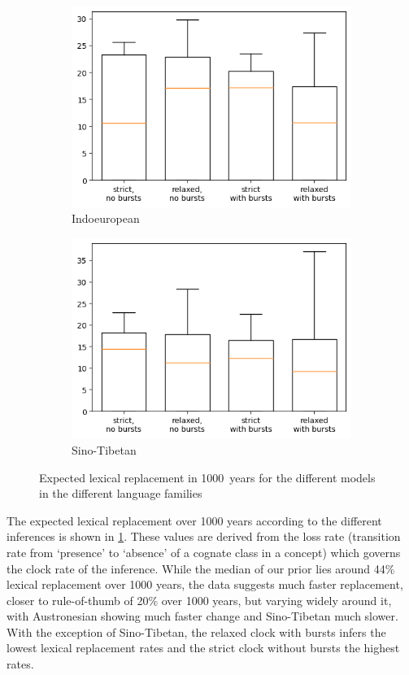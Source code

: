 \documentclass[a4paper,12pt]{scrartcl}
\begin{document}
\begin{figure}
\begin{subfigure}{0.4\textwidth}
    \includegraphics[width=\textwidth]{supplement/analysis/indoeuropean_replacement.png}
    \caption{Indoeuropean}
  \end{subfigure}
  \begin{subfigure}{0.4\textwidth}
    \includegraphics[width=\textwidth]{supplement/analysis/sinotibetan_replacement.png}
    \caption{Sino-Tibetan}
  \end{subfigure}
  \caption{Expected lexical replacement in 1000~years for the different models
    in the different language families}\label{f:clock}
\end{figure}

The expected lexical replacement over 1000 years according to the different
inferences is shown in \cref{f:clock}. These values are derived from the loss
rate (transition rate from ‘presence’ to ‘absence’ of a cognate class in a
concept) which governs the clock rate of the inference. While the median of our
prior lies around 44\% lexical replacement over 1000 years, the data suggests
much faster replacement, closer to \textcite{swadesh1955greater}
rule-of-thumb of 20\% over 1000 years, but varying widely around it, with
Austronesian showing much faster change and Sino-Tibetan much slower. With the
exception of Sino-Tibetan, the relaxed clock with bursts infers the lowest
lexical replacement rates and the strict clock without bursts the highest rates.
\end{document}
